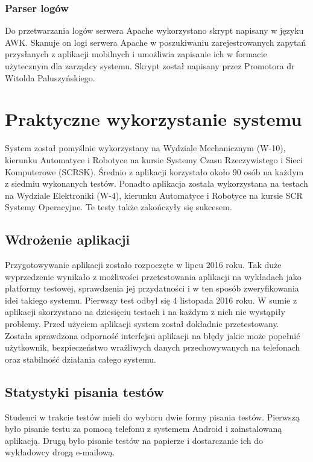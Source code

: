 \documentclass[archivemod, eng]{mgr}
\begin{document}
			\subsection{Parser logów}
			Do przetwarzania logów serwera Apache wykorzystano skrypt napisany w języku AWK. Skanuje on logi serwera Apache w poszukiwaniu zarejestrowanych zapytań przysłanych z aplikacji mobilnych i umożliwia zapisanie ich w formacie użytecznym dla zarządcy systemu. Skrypt został napisany przez Promotora dr Witolda Paluszyńskiego.
			

	\chapter{Praktyczne wykorzystanie systemu}
	
	System został pomyślnie wykorzystany na Wydziale Mechanicznym (W-10), kierunku Automatyce i Robotyce na kursie Systemy Czasu Rzeczywistego i Sieci Komputerowe (SCRSK). Średnio z aplikacji korzystało około 90 osób na każdym z siedmiu wykonanych testów. Ponadto aplikacja została wykorzystana na testach na Wydziale Elektroniki (W-4), kierunku Automatyce i Robotyce na kursie SCR Systemy Operacyjne. Te testy także zakończyły się sukcesem.
	
		\section{Wdrożenie aplikacji}
		
		Przygotowywanie aplikacji zostało rozpoczęte w lipcu 2016 roku. Tak duże wyprzedzenie wynikało z możliwości przetestowania aplikacji na wykładach jako platformy testowej, sprawdzenia jej przydatności i w ten sposób zweryfikowania idei takiego systemu. Pierwszy test odbył się 4 listopada 2016 roku. W sumie z aplikacji skorzystano na dziesięciu testach i na każdym z nich nie wystąpiły problemy. Przed użyciem aplikacji system został dokładnie przetestowany. Została sprawdzona odporność interfejsu aplikacji na błędy jakie może popełnić użytkownik, bezpieczeństwo wrażliwych danych przechowywanych na telefonach oraz stabilność działania całego systemu.

		\section{Statystyki pisania testów}
			
		Studenci w trakcie testów mieli do wyboru dwie formy pisania testów. Pierwszą było pisanie testu za pomocą telefonu z systemem Android i zainstalowaną aplikacją. Drugą było pisanie testów na papierze i dostarczanie ich do wykładowcy drogą e-mailową.\\
		
\end{document}
